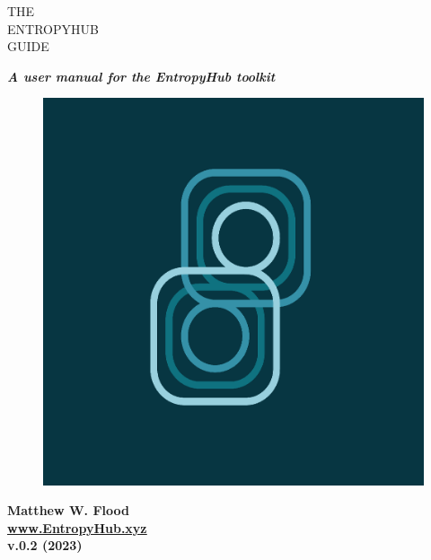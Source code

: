 \begin{titlepage}
\color{ehone}
\fontsize{60pt}{72pt}
\noindent THE \\ ENTROPYHUB \\ GUIDE\\ 
\vspace{5mm}
\normalfont		
   \begin{center}
    \Large
	\noindent \textbf{\textit{A user manual for the EntropyHub toolkit}} \\
   \end{center}
 
\vspace{7cm}
\begin{figure}
\includegraphics[width=1\linewidth]{EntropyHub_profiler.png} 
\label{fig:wrapfig}
\end{figure}

\normalsize 
\noindent \textbf{Matthew W. Flood}	
\newline \\ \newline
\noindent \href{https://www.EntropyHub.xyz}{\ul{\textbf{www.EntropyHub.xyz}}} 
\newline \\ \newline
\noindent \textbf{v.0.2 (2023)}

\normalsize
\color{black}
\end{titlepage}



